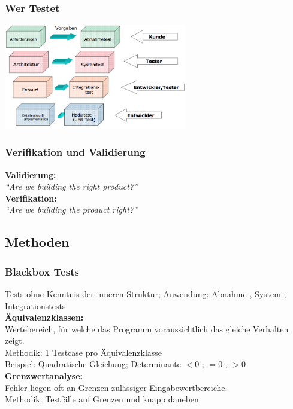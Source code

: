 \begin{multicols}{2}
\subsubsection{Wer Testet}
\includegraphics[width=8cm]{images/wer_testet.png}

\subsubsection{Verifikation und Validierung}
\textbf{Validierung:}\\
\textit{``Are we building the right product?''} \\

\textbf{Verifikation:} \\
\textit{``Are we building the product right?''} \\

\newpage

\subsection{Methoden}
\subsubsection{Blackbox Tests}
Tests ohne Kenntnis der inneren Struktur; Anwendung: Abnahme-, System-, Integrationstests \\

\textbf{Äquivalenzklassen:} \\
Wertebereich, für welche das Programm voraussichtlich das gleiche Verhalten zeigt. \\
Methodik: 1 Testcase pro Äquivalenzklasse \\
Beispiel: Quadratische Gleichung; Determinante $<0$ ; $=0$ ; $>0$ \\

\textbf{Grenzwertanalyse:} \\
Fehler liegen oft an Grenzen zulässiger Eingabewertbereiche. \\
Methodik: Testfälle auf Grenzen und knapp daneben \\


\end{multicols}
